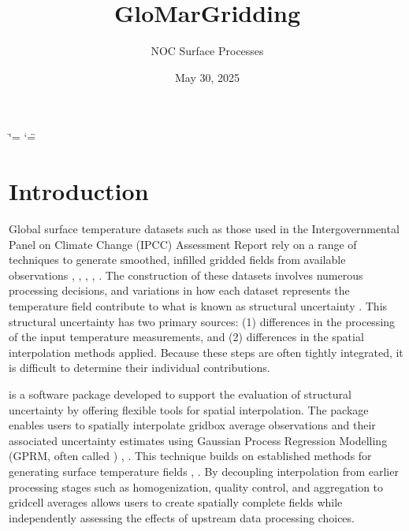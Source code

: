 \documentclass[letterpaper,10pt,english]{sphinxmanual}
\title{GloMarGridding}
\date{May 30, 2025}
\author{NOC Surface Processes}
\begin{document}
\ifdefined\shorthandoff
  \ifnum\catcode`\=\string=\active\shorthandoff{=}\fi
  \ifnum\catcode`\"=\active{}\fi
\fi

\pagestyle{empty}
\sphinxmaketitle
\pagestyle{plain}
\sphinxtableofcontents
\pagestyle{normal}
\label{\detokenize{index::doc}}


\sphinxstepscope


\chapter{Introduction}
\label{\detokenize{introduction:introduction}}\label{\detokenize{introduction::doc}}
\sphinxAtStartPar
Global surface temperature datasets \sphinxhyphen{} such as those used in the Intergovernmental Panel on Climate
Change (IPCC) Assessment Report  rely on a range of techniques to generate smoothed, infilled
gridded fields from available observations , , , ,
 . The construction of these datasets involves numerous processing decisions, and variations
in how each dataset represents the temperature field contribute to what is known as structural
uncertainty . This structural uncertainty has two primary sources: (1) differences in the
processing of the input temperature measurements, and (2) differences in the spatial interpolation
methods applied. Because these steps are often tightly integrated, it is difficult to determine
their individual contributions.

\sphinxAtStartPar
{} is a software package developed to support the evaluation of structural
uncertainty by offering flexible tools for spatial interpolation. The package enables users to
spatially interpolate grid\sphinxhyphen{}box average observations and their associated uncertainty estimates using
Gaussian Process Regression Modelling (GPRM, often called ) ,  . This
technique builds on established methods for generating surface temperature fields ,
. By decoupling interpolation from earlier processing stages \sphinxhyphen{} such as homogenization,
quality control, and aggregation to grid\sphinxhyphen{}cell averages \sphinxhyphen{}  allows users to create
spatially complete fields while independently assessing the effects of upstream data processing
choices.
\end{document}
